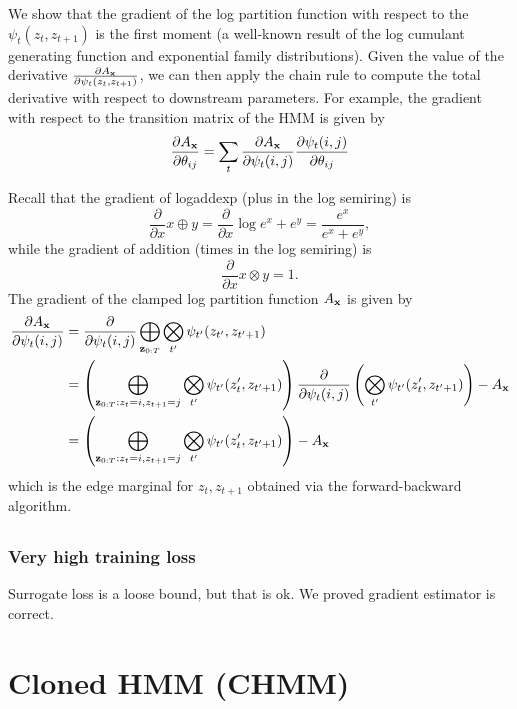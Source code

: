 \documentclass[12pt]{article}
\begin{document}
We show that the gradient of the log partition function with respect to the $\psi_t(z_t, z_{t+1})$
is the first moment (a well-known result of the log cumulant generating function
and exponential family distributions). Given the value of the derivative
$\frac{\partial A_{\mathbf{x}}}{\partial \psi_t(z_t, z_{t+1})}$,
we can then apply the chain rule to compute the total derivative with respect to
downstream parameters. For example, the gradient with respect to the transition matrix
of the HMM is given by
$$\frac{\partial A_{\mathbf{x}}}{\partial \theta_{ij}}
= \sum_t \frac{\partial A_{\mathbf{x}}}{\partial \psi_t(i,j)}
\frac{\partial \psi_t(i,j)}{\partial \theta_{ij}}$$

Recall that the gradient of logaddexp (plus in the log semiring) is
$$\frac{\partial}{\partial x} x \oplus y
= \frac{\partial}{\partial x} \log e^x + e^ y = \frac{e^x}{e^x + e^y},$$
while the gradient of addition (times in the log semiring) is
$$\frac{\partial}{\partial x} x \otimes y = 1.$$
The gradient of the clamped log partition function $A_{\mathbf{x}}$ is given by
\begin{align*}
\frac{\partial A_{\mathbf{x}}}{\partial \psi_t(i,j)}
&= \frac{\partial}{\partial \psi_t(i,j)} \bigoplus_{\mathbf{z}_{0:T}}
    \bigotimes_{t'} \psi_{t'}(z_{t'}, z_{t'+1})\\
&= \left(\bigoplus_{\mathbf{z}_{0:T}:z_t = i, z_{t+1} = j} 
    \bigotimes_{t'} \psi_{t'}(z_{t}', z_{t'+1})\right)
    \frac{\partial}{\partial \psi_t(i,j)}\left(\bigotimes_{t'} \psi_{t'}(z_{t}', z_{t'+1})\right) - A_{\mathbf{x}}\\
&= \left(\bigoplus_{\mathbf{z}_{0:T}:z_t = i, z_{t+1} = j} 
    \bigotimes_{t'} \psi_{t'}(z_{t}', z_{t'+1})\right)
    - A_{\mathbf{x}}
\end{align*} 
which is the edge marginal for $z_t, z_{t+1}$ obtained via the forward-backward algorithm.

\subsection{}


\subsubsection{Very high training loss}
Surrogate loss is a loose bound, but that is ok.
We proved gradient estimator is correct.

\section{Cloned HMM (CHMM)}




%
%
\end{document}
